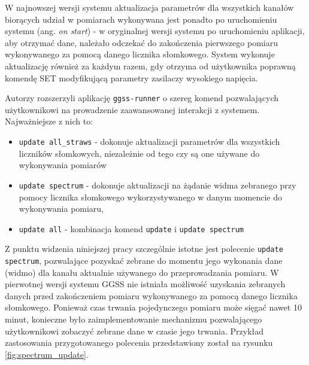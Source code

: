 

W najnowszej wersji systemu aktualizacja parametrów dla wszystkich kanałów biorących udział w pomiarach wykonywana jest ponadto po uruchomieniu systemu (ang. \emph{on start}) - w oryginalnej wersji systemu po uruchomieniu aplikacji, aby otrzymać dane, należało odczekać do zakończenia pierwszego pomiaru wykonywanego za pomocą danego licznika słomkowego. System wykonuje aktualizację również za każdym razem, gdy otrzyma od użytkownika poprawną komendę SET modyfikującą parametry zasilaczy wysokiego napięcia.

Autorzy rozszerzyli aplikację \lstinline{ggss-runner} o szereg komend pozwalających użytkownikowi na prowadzenie zaawansowanej interakcji z systemem. Najważniejsze z nich to:
\begin{itemize}
\item \lstinline{update all_straws} - dokonuje aktualizacji parametrów dla wszystkich liczników słomkowych, niezależnie od tego czy są one używane do wykonywania pomiarów
\item \lstinline{update spectrum} - dokonuje aktualizacji na żądanie widma zebranego przy pomocy licznika słomkowego wykorzystywanego w danym momencie do wykonywania pomiaru, 
\item \lstinline{update all} - kombinacja komend \lstinline{update} i \lstinline{update spectrum}
\end{itemize}

Z punktu widzenia niniejszej pracy szczególnie istotne jest polecenie \lstinline{update spectrum}, pozwalające pozyskać zebrane do momentu jego wykonania dane (widmo) dla kanału aktualnie używanego do przeprowadzania pomiaru. W pierwotnej wersji systemu GGSS nie istniała możliwość uzyskania zebranych danych przed zakończeniem pomiaru wykonywanego za pomocą danego licznika słomkowego. Ponieważ czas trwania pojedynczego pomiaru może sięgać nawet 10 minut, konieczne było zaimplementowanie mechanizmu pozwalającego użytkownikowi zobaczyć zebrane dane w czasie jego trwania. Przykład zastosowania przygotowanego polecenia przedstawiony został na rysunku \ref{fig:spectrum_update}.

